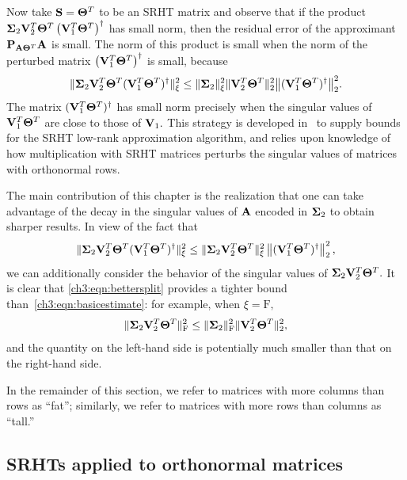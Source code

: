Now take $\mathbf{S} = \mathbf{\Theta}^T$ to be an SRHT matrix
and observe that if the product $\mathbf{\Sigma}_2 \mathbf{V}_2 ^T \mathbf{\Theta}^T 
\left( \mathbf{V}_1 ^T \mathbf{\Theta}^T\right)^\dagger$ has small norm, then the residual 
error of the approximant $\mathbf{P}_{\mathbf{A} \mathbf{\Theta} ^T} \mathbf{A}$ is small. The norm of 
this product is small when the norm of the perturbed matrix
$\left(\mathbf{V}_1 ^T \mathbf{\Theta}^T\right)^\dagger$ 
is small, because
%
\begin{equation}
\label{ch3:eqn:basicestimate}
\mbox{}\|\mathbf{\Sigma}_2 \mathbf{V}_2 ^T \mathbf{\Theta}^T 
( \mathbf{V}_1 ^T \mathbf{\Theta}^T)^\dagger\|_{\xi}^2 
\leq \|\mathbf{\Sigma}_2\|_{\xi}^2 \|\mathbf{V}_2 ^T \mathbf{\Theta}^T\|_2^2
\big\|( \mathbf{V}_1 ^T \mathbf{\Theta}^T)^\dagger\big\|_2^2.
\end{equation}
%
The matrix $(\mathbf{V}_1^T \mathbf{\Theta}^T)^\dagger$ has small norm precisely when 
the singular values of $\mathbf{V}_1^T \mathbf{\Theta}^T$ are close to those of 
$\mathbf{V}_1.$ This strategy is developed in~\cite{HMT11} to supply bounds for
the SRHT low-rank approximation algorithm, and relies upon knowledge of how multiplication with
SRHT matrices perturbs the singular values of matrices with orthonormal rows.

The main contribution of this chapter is the realization that one can take advantage
of the decay in the singular values of $\mathbf{A}$ encoded in $\mathbf{\Sigma}_2$ to obtain 
sharper results. In view of the fact that
%
\begin{equation}
\label{ch3:eqn:bettersplit}
 \mbox{}\|\mathbf{\Sigma}_2 \mathbf{V}_2 ^T \mathbf{\Theta}^T 
  ( \mathbf{V}_1 ^T \mathbf{\Theta}^T)^\dagger\|_{\xi}^2 \leq 
 \mbox{}\|\mathbf{\Sigma}_2 \mathbf{V}_2 ^T \mathbf{\Theta}^T\|_{\xi}^2 
 \left\|(\mathbf{V}_1 ^T \mathbf{\Theta}^T)^\dagger\right\|_2^2,
\end{equation}
%
we can additionally consider the behavior of the singular values of 
$\mathbf{\Sigma}_2 \mathbf{V}_2 ^T \mathbf{\Theta}^T.$ It is clear that \eqref{ch3:eqn:bettersplit}
provides a tighter bound than~\eqref{ch3:eqn:basicestimate}: for example, when
$\xi = \mathrm{F},$ 
\[
  \|\mathbf{\Sigma}_2 \mathbf{V}_2 ^T \mathbf{\Theta}^T\|_{\mathrm{F}}^2 \leq  \|\mathbf{\Sigma}_2\|_{\mathrm{F}}^2 \|\mathbf{V}_2 ^T \mathbf{\Theta}^T\|_2^2,
\]
and the quantity on the left-hand side is potentially much smaller than that on the right-hand side.

In the remainder of this section, we refer to matrices with more columns than rows
as ``fat''; similarly, we refer to matrices with more rows than columns as ``tall.''

\subsection{SRHTs applied to orthonormal matrices}
\label{ch3:sec:SRHT-orthonormal}

